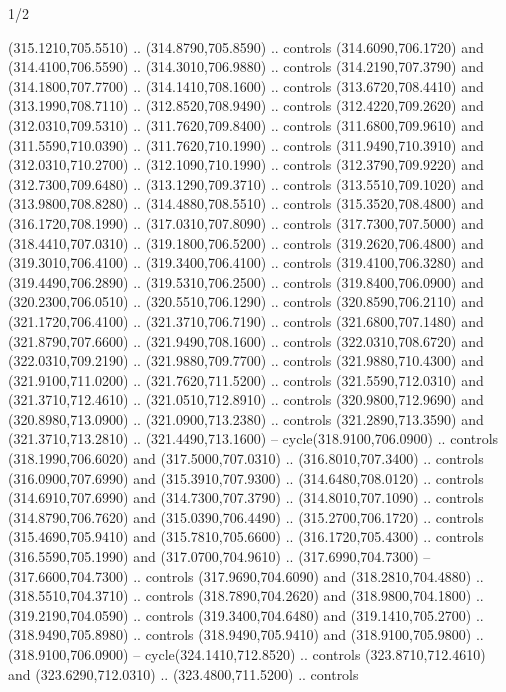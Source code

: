 \begin{flagdescription}{1/2}
\begin{scope}[xshift=0.5\flaglength]
\begin{scope}[scale=0.00745\flagwidth,xshift=-12.1mm,yshift=41.7mm]
\begin{scope}[y=0.80pt, x=0.80pt, yscale=-1, xscale=1, inner sep=0pt, outer sep=0pt]
\begin{scope}[cm={{1.33333,0.0,0.0,-1.33333,(0.0,114.66667)}}]
\begin{scope}[scale=0.100]
  (315.1210,705.5510) .. (314.8790,705.8590) .. controls (314.6090,706.1720) and
  (314.4100,706.5590) .. (314.3010,706.9880) .. controls (314.2190,707.3790) and
  (314.1800,707.7700) .. (314.1410,708.1600) .. controls (313.6720,708.4410) and
  (313.1990,708.7110) .. (312.8520,708.9490) .. controls (312.4220,709.2620) and
  (312.0310,709.5310) .. (311.7620,709.8400) .. controls (311.6800,709.9610) and
  (311.5590,710.0390) .. (311.7620,710.1990) .. controls (311.9490,710.3910) and
  (312.0310,710.2700) .. (312.1090,710.1990) .. controls (312.3790,709.9220) and
  (312.7300,709.6480) .. (313.1290,709.3710) .. controls (313.5510,709.1020) and
  (313.9800,708.8280) .. (314.4880,708.5510) .. controls (315.3520,708.4800) and
  (316.1720,708.1990) .. (317.0310,707.8090) .. controls (317.7300,707.5000) and
  (318.4410,707.0310) .. (319.1800,706.5200) .. controls (319.2620,706.4800) and
  (319.3010,706.4100) .. (319.3400,706.4100) .. controls (319.4100,706.3280) and
  (319.4490,706.2890) .. (319.5310,706.2500) .. controls (319.8400,706.0900) and
  (320.2300,706.0510) .. (320.5510,706.1290) .. controls (320.8590,706.2110) and
  (321.1720,706.4100) .. (321.3710,706.7190) .. controls (321.6800,707.1480) and
  (321.8790,707.6600) .. (321.9490,708.1600) .. controls (322.0310,708.6720) and
  (322.0310,709.2190) .. (321.9880,709.7700) .. controls (321.9880,710.4300) and
  (321.9100,711.0200) .. (321.7620,711.5200) .. controls (321.5590,712.0310) and
  (321.3710,712.4610) .. (321.0510,712.8910) .. controls (320.9800,712.9690) and
  (320.8980,713.0900) .. (321.0900,713.2380) .. controls (321.2890,713.3590) and
  (321.3710,713.2810) .. (321.4490,713.1600) -- cycle(318.9100,706.0900) ..
  controls (318.1990,706.6020) and (317.5000,707.0310) .. (316.8010,707.3400) ..
  controls (316.0900,707.6990) and (315.3910,707.9300) .. (314.6480,708.0120) ..
  controls (314.6910,707.6990) and (314.7300,707.3790) .. (314.8010,707.1090) ..
  controls (314.8790,706.7620) and (315.0390,706.4490) .. (315.2700,706.1720) ..
  controls (315.4690,705.9410) and (315.7810,705.6600) .. (316.1720,705.4300) ..
  controls (316.5590,705.1990) and (317.0700,704.9610) .. (317.6990,704.7300) --
  (317.6600,704.7300) .. controls (317.9690,704.6090) and (318.2810,704.4880) ..
  (318.5510,704.3710) .. controls (318.7890,704.2620) and (318.9800,704.1800) ..
  (319.2190,704.0590) .. controls (319.3400,704.6480) and (319.1410,705.2700) ..
  (318.9490,705.8980) .. controls (318.9490,705.9410) and (318.9100,705.9800) ..
  (318.9100,706.0900) -- cycle(324.1410,712.8520) .. controls
  (323.8710,712.4610) and (323.6290,712.0310) .. (323.4800,711.5200) .. controls

\end{scope}
\end{scope}
\end{scope}
\end{scope}
\end{scope}
\end{flagdescription}

